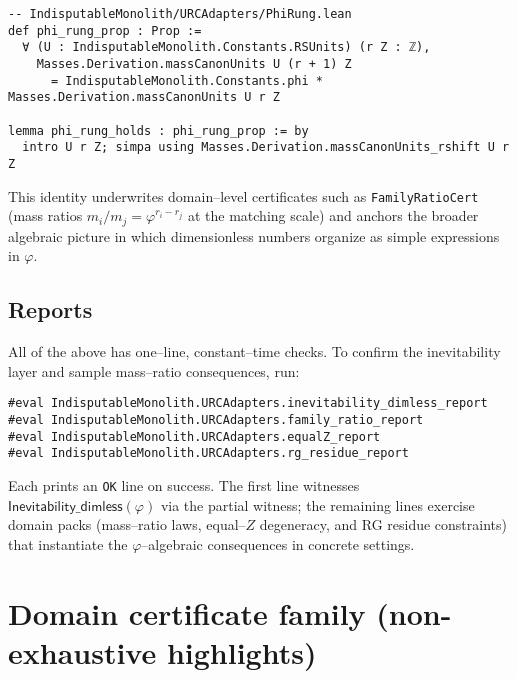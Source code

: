 \documentclass[11pt,a4paper,twoside]{article}
\numberwithin{equation}{section}
\newcommand{\phigr}{\varphi} %
\theoremstyle{customthm}
\theoremstyle{customdef}
\theoremstyle{customrem}
\begin{document}
\begin{lstlisting}
-- IndisputableMonolith/URCAdapters/PhiRung.lean
def phi_rung_prop : Prop :=
  ∀ (U : IndisputableMonolith.Constants.RSUnits) (r Z : ℤ),
    Masses.Derivation.massCanonUnits U (r + 1) Z
      = IndisputableMonolith.Constants.phi * Masses.Derivation.massCanonUnits U r Z

lemma phi_rung_holds : phi_rung_prop := by
  intro U r Z; simpa using Masses.Derivation.massCanonUnits_rshift U r Z
\end{lstlisting}

\noindent This identity underwrites domain–level certificates such as \texttt{FamilyRatioCert} (mass ratios $m_i/m_j = \phigr^{r_i-r_j}$ at the matching scale) and anchors the broader algebraic picture in which dimensionless numbers organize as simple expressions in $\phigr$.

\subsection{Reports}

All of the above has one–line, constant–time checks. To confirm the inevitability layer and sample mass–ratio consequences, run:

\begin{lstlisting}
#eval IndisputableMonolith.URCAdapters.inevitability_dimless_report
#eval IndisputableMonolith.URCAdapters.family_ratio_report
#eval IndisputableMonolith.URCAdapters.equalZ_report
#eval IndisputableMonolith.URCAdapters.rg_residue_report
\end{lstlisting}

\noindent Each prints an \texttt{OK} line on success. The first line witnesses $\mathsf{Inevitability\_dimless}(\phigr)$ via the partial witness; the remaining lines exercise domain packs (mass–ratio laws, equal–$Z$ degeneracy, and RG residue constraints) that instantiate the $\phigr$–algebraic consequences in concrete settings.

\section{Domain certificate family (non-exhaustive highlights)}\label{sec:domains}
\end{document}
